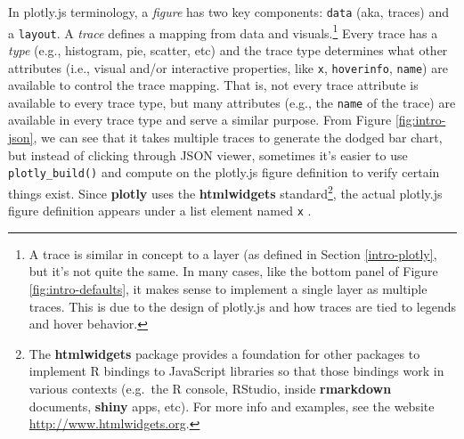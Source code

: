 \documentclass[
  12pt,
]{krantz}
\newenvironment{Shaded}{\begin{snugshade}}{\end{snugshade}}
\newcommand{\CommentTok}[1]{\textcolor[rgb]{0.56,0.35,0.01}{\textit{#1}}}
\newcommand{\KeywordTok}[1]{\textcolor[rgb]{0.13,0.29,0.53}{\textbf{#1}}}
\newcommand{\NormalTok}[1]{#1}
\newcommand{\OperatorTok}[1]{\textcolor[rgb]{0.81,0.36,0.00}{\textbf{#1}}}
\newcommand{\StringTok}[1]{\textcolor[rgb]{0.31,0.60,0.02}{#1}}
\begin{document}
In plotly.js terminology, a \emph{figure} has two key components: \texttt{data} (aka, traces) and a \texttt{layout}. A \emph{trace} defines a mapping from data and visuals.\footnote{A trace is similar in concept to a layer (as defined in Section \ref{intro-plotly}, but it's not quite the same. In many cases, like the bottom panel of Figure \ref{fig:intro-defaults}, it makes sense to implement a single layer as multiple traces. This is due to the design of plotly.js and how traces are tied to legends and hover behavior.} Every trace has a \emph{type} (e.g., histogram, pie, scatter, etc) and the trace type determines what other attributes (i.e., visual and/or interactive properties, like \texttt{x}, \texttt{hoverinfo}, \texttt{name}) are available to control the trace mapping. That is, not every trace attribute is available to every trace type, but many attributes (e.g., the \texttt{name} of the trace) are available in every trace type and serve a similar purpose. From Figure \ref{fig:intro-json}, we can see that it takes multiple traces to generate the dodged bar chart, but instead of clicking through JSON viewer, sometimes it's easier to use \texttt{plotly\_build()} and compute on the plotly.js figure definition to verify certain things exist. Since \textbf{plotly} uses the \textbf{htmlwidgets} standard\footnote{The \textbf{htmlwidgets} package provides a foundation for other packages to implement R bindings to JavaScript libraries so that those bindings work in various contexts (e.g.~the R console, RStudio, inside \textbf{rmarkdown} documents, \textbf{shiny} apps, etc). For more info and examples, see the website \url{http://www.htmlwidgets.org}.}, the actual plotly.js figure definition appears under a list element named \texttt{x} \citep{htmlwidgets}.

\begin{Shaded}
\end{Shaded}
\end{document}
